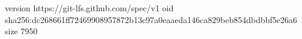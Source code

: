 version https://git-lfs.github.com/spec/v1
oid sha256:dc268661ff72469908957872b13c97a0eaaeda146ca829beb854dbdbbf5e26a6
size 7950
